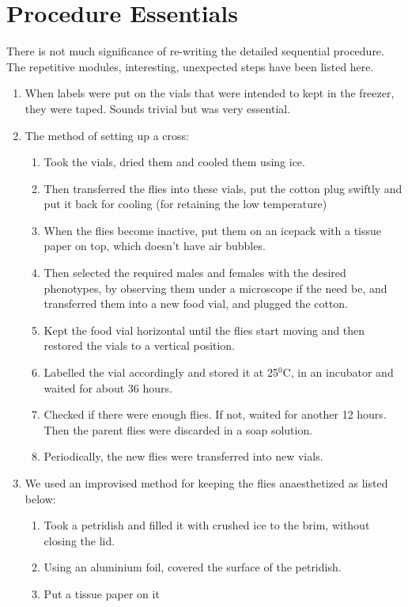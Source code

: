 \section{Procedure Essentials}
	There is not much significance of re-writing the detailed sequential procedure. The repetitive modules, interesting, unexpected steps have been listed here.
	\begin{enumerate}
		\item When labels were put on the vials that were intended to kept in the freezer, they were taped. Sounds trivial but was very essential.
		\item The method of setting up a cross:
			\begin{enumerate}
				\item Took the vials, dried them and cooled them using ice. 
				\item Then transferred the flies into these vials, put the cotton plug swiftly and put it back for cooling (for retaining the low temperature)
				\item When the flies become inactive, put them on an icepack with a tissue paper on top, which doesn't have air bubbles. 
				\item Then selected the required males and females with the desired phenotypes, by observing them under a microscope if the need be, and transferred them into a new food vial, and plugged the cotton.
				\item Kept the food vial horizontal until the flies start moving and then restored the vials to a vertical position. 
				\item Labelled the vial accordingly and stored it at 25$^{0}$C, in an incubator and waited for about 36 hours.
				\item Checked if there were enough flies. If not, waited for another 12 hours. Then the parent flies were discarded in a soap solution. 
				\item Periodically, the new flies were transferred into new vials. 
			\end{enumerate}
		\item We used an improvised method for keeping the flies anaesthetized as listed below:
			\begin{enumerate}
				\item Took a petridish and filled it with crushed ice to the brim, without closing the lid.
				\item Using an aluminium foil, covered the surface of the petridish.
				\item Put a tissue paper on it
			\end{enumerate}
	\end{enumerate}

